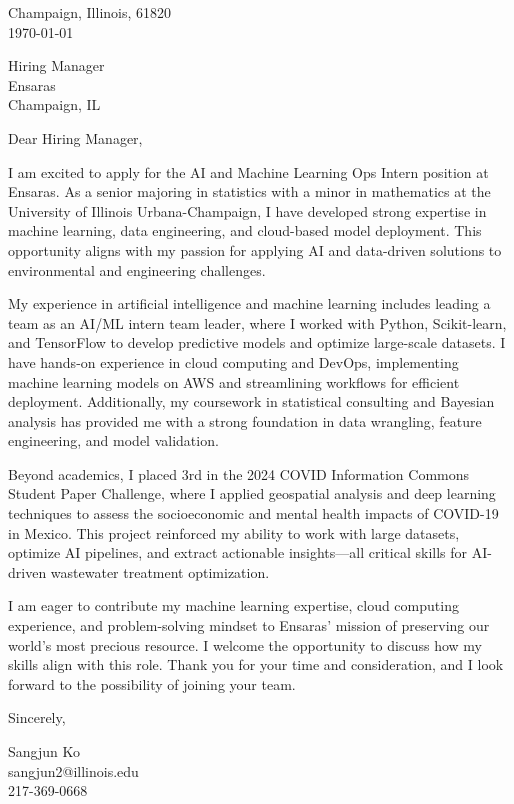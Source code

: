 \documentclass[11pt]{article}
\begin{document}
\noindent
Champaign, Illinois, 61820 \\
\today
\vspace{2em}

\noindent
Hiring Manager \\
Ensaras \\
Champaign, IL \\

\vspace{1.5em}

Dear Hiring Manager,

I am excited to apply for the AI and Machine Learning Ops Intern position at Ensaras. As a senior majoring in statistics with a minor in mathematics at the University of Illinois Urbana-Champaign, I have developed strong expertise in machine learning, data engineering, and cloud-based model deployment. This opportunity aligns with my passion for applying AI and data-driven solutions to environmental and engineering challenges.

My experience in artificial intelligence and machine learning includes leading a team as an AI/ML intern team leader, where I worked with Python, Scikit-learn, and TensorFlow to develop predictive models and optimize large-scale datasets. I have hands-on experience in cloud computing and DevOps, implementing machine learning models on AWS and streamlining workflows for efficient deployment. Additionally, my coursework in statistical consulting and Bayesian analysis has provided me with a strong foundation in data wrangling, feature engineering, and model validation.

Beyond academics, I placed 3rd in the 2024 COVID Information Commons Student Paper Challenge, where I applied geospatial analysis and deep learning techniques to assess the socioeconomic and mental health impacts of COVID-19 in Mexico. This project reinforced my ability to work with large datasets, optimize AI pipelines, and extract actionable insights—all critical skills for AI-driven wastewater treatment optimization.

I am eager to contribute my machine learning expertise, cloud computing experience, and problem-solving mindset to Ensaras' mission of preserving our world’s most precious resource. I welcome the opportunity to discuss how my skills align with this role. Thank you for your time and consideration, and I look forward to the possibility of joining your team.

\vspace{1em}

Sincerely,

\vspace{2em}

\noindent
Sangjun Ko\\
sangjun2@illinois.edu\\
217-369-0668
\end{document}
